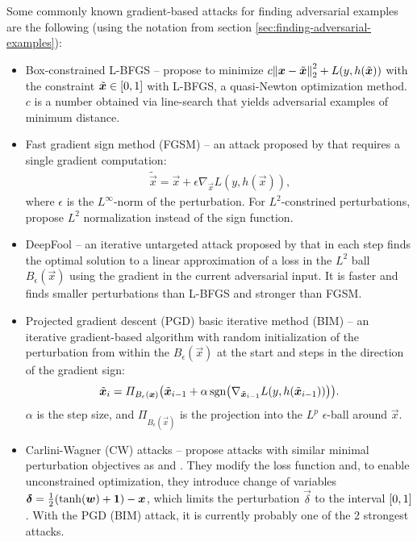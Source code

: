 \documentclass{article}
\begin{document}
Some commonly known gradient-based attacks for finding adversarial examples are the following (using the notation from section \ref{sec:finding-adversarial-examples}):
\begin{itemize}
	\item Box-constrained L-BFGS -- \citet{Szegedy:2013:IPNN} propose to minimize $c\enVert{\vec x -\tilde{\vec x}}_2^2+L(y,h(\tilde{\vec x}))$ with the constraint $\tilde{\vec x}\in\intcc{0,1}$ with L-BFGS, a quasi-Newton optimization method. $c$ is a number obtained via line-search that yields adversarial examples of minimum distance.
	\item Fast gradient sign method (FGSM) -- an attack proposed by \citet{Goodfellow:2014:EHAE} that requires a single gradient computation:
	\begin{align}
	\tilde{\vec x} = \vec x + \epsilon\nabla_{\vec x} L(y,h(\vec x)) \text{,}
	\end{align} 
	where $\epsilon$ is the $L^\infty$-norm of the perturbation. For $L^2$-constrined perturbations, \citet{Miyato:2017:VATRMSSSL} propose $L^2$ normalization instead of the sign function.
	\item DeepFool -- an iterative untargeted attack proposed by \cite{Moosavi-Dezfooli:2016:DFSAMFDNN} that in each step finds the optimal solution to a linear approximation of a loss in the $L^2$ ball $B_\epsilon(\vec x)$ using the gradient in the current adversarial input. It is faster and finds smaller perturbations than L-BFGS and stronger than FGSM.
	\item Projected gradient descent (PGD) \citep{Madry:2017:TDLMRAA} basic iterative method (BIM) \citep{Kurakin:2016:AEPW} -- an iterative gradient-based algorithm with random initialization \citep{Madry:2017:TDLMRAA} of the perturbation from within the $B_\epsilon(\vec x)$ at the start and steps in the direction of the gradient sign:
	\begin{equation} \label{eq:pgd}
	\tilde{\vec x}_i = \Pi_{B_\epsilon(\vec x)} \del{\tilde{\vec x}_{i-1} + \alpha\sgn\del{\nabla_{\tilde{\vec x}_{i-1}} L(y,h(\tilde{\vec x}_{i-1}))}} \text{.}
	\end{equation}
	$\alpha$ is the step size, and $\Pi_{B_\epsilon(\vec x)}$ is the projection into the $L^p$ $\epsilon$-ball around $\vec x$.
	\item Carlini-Wagner (CW) attacks -- \citet{Carlini:2017:TERNN} propose attacks with similar minimal perturbation objectives as \cite{Szegedy:2013:IPNN} and \citet{Moosavi-Dezfooli:2016:DFSAMFDNN}. They modify the loss function and, to enable unconstrained optimization, they introduce change of variables $\vec\delta=\frac{1}{2}\del{\tanh\del{\vec w} + \cvec 1} - \vec x$, which limits the perturbation $\vec\delta$ to the interval $\intcc{0,1}$. With the PGD (BIM) attack, it is currently probably one of the 2 strongest attacks.
\end{itemize}
\end{document}
